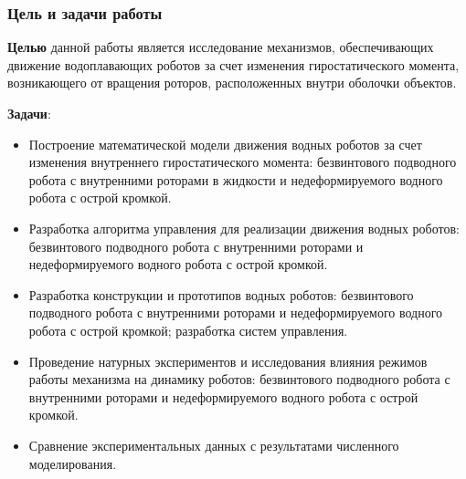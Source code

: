 \begin{frame}
    \setcounter{framenumber}{1}
    \maketitle
\end{frame}


\begin{frame}
\frametitle{Цель и задачи работы}
\footnotesize

\quad \textbf{Целью} данной работы является исследование механизмов, обеспечивающих движение водоплавающих роботов за счет изменения гиростатического момента, возникающего от вращения роторов, расположенных внутри оболочки объектов.

\textbf{Задачи}:
\begin{itemize}
	\item Построение математической модели движения водных роботов за счет изменения внутреннего гиростатического момента: безвинтового подводного робота с внутренними роторами в жидкости и недеформируемого водного робота с острой кромкой.
	\item Разработка алгоритма управления для реализации движения водных роботов: безвинтового подводного робота с внутренними роторами и недеформируемого водного робота с острой кромкой.
	\item Разработка конструкции и прототипов водных роботов: безвинтового подводного робота с внутренними роторами и недеформируемого водного робота с острой кромкой; разработка систем управления.
	\item Проведение натурных экспериментов и исследования влияния режимов работы механизма на динамику роботов: безвинтового подводного робота с внутренними роторами и недеформируемого водного робота с острой кромкой.
	\item Сравнение экспериментальных данных с результатами численного моделирования.
\end{itemize}
\end{frame}

